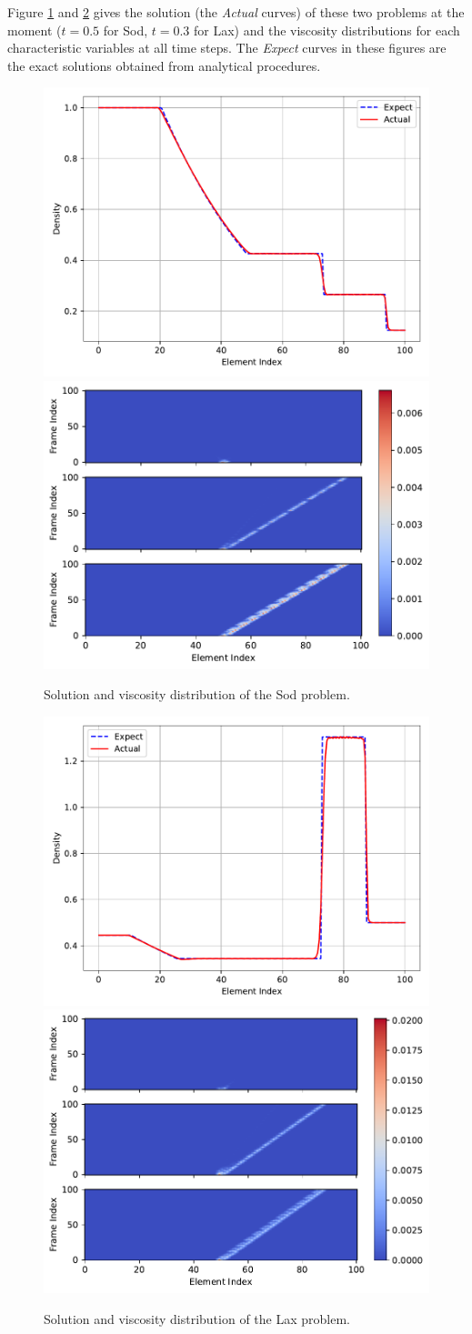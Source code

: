 \documentclass[10pt]{article}
\begin{document}
Figure \ref{fig:sod} and \ref{fig:lax} gives the solution (the \emph{Actual} curves) of these two problems at the moment ($t=0.5$ for Sod, $t=0.3$ for Lax) and the viscosity distributions for each characteristic variables at all time steps.
%
The \emph{Expect} curves in these figures are the exact solutions obtained from analytical procedures.
\begin{figure}[H]
  \centering
  \includegraphics[width=.49\textwidth]{./sod/Frame100.pdf}
  \includegraphics[width=.49\textwidth]{./sod/Viscosity.pdf}
  \caption{Solution and viscosity distribution of the Sod problem.}
  \label{fig:sod}
\end{figure}

\begin{figure}[H]
  \centering
  \includegraphics[width=.49\textwidth]{./lax/Frame100.pdf}
  \includegraphics[width=.49\textwidth]{./lax/Viscosity.pdf}
  \caption{Solution and viscosity distribution of the Lax problem.}
  \label{fig:lax}
\end{figure}
\end{document}
